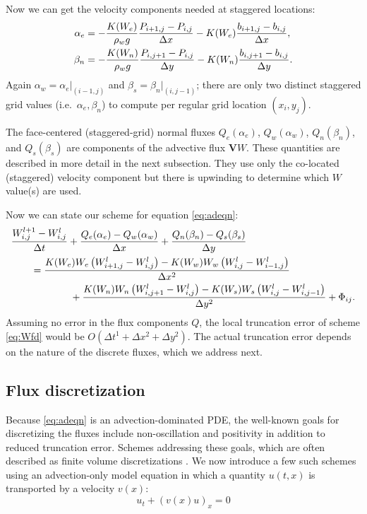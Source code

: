 \documentclass[11pt,final]{amsart}%
\newcommand\bV{\mathbf{V}}
\newcommand{\Wlij}{W^l_{i,j}}
\begin{document}
Now we can get the velocity components needed at staggered locations:
\begin{align}
\alpha_e &= - \frac{K(W_e)}{\rho_w g} \frac{P_{i+1,j}-P_{i,j}}{\Delta x} - K(W_e) \frac{b_{i+1,j}-b_{i,j}}{\Delta x}, \label{eq:velocitycomp} \\
\beta_n  &= - \frac{K(W_n)}{\rho_w g} \frac{P_{i,j+1}-P_{i,j}}{\Delta y} - K(W_n) \frac{b_{i,j+1}-b_{i,j}}{\Delta y}. \notag
\end{align}
Again $\alpha_w = \alpha_e\big|_{(i-1,j)}$ and $\beta_s = \beta_n\big|_{(i,j-1)}$; there are only two distinct staggered grid values (i.e.~$\alpha_e,\beta_n$) to compute per regular grid location $(x_i,y_j)$.

The face-centered (staggered-grid) normal fluxes $Q_e(\alpha_e)$, $Q_w(\alpha_w)$, $Q_n(\beta_n)$, and $Q_s(\beta_s)$ are components of the advective flux $\bV W$.  These quantities are described in more detail in the next subsection.  They use only the co-located (staggered) velocity component but there is upwinding to determine which $W$ value(s) are used.

Now we can state our scheme for equation \eqref{eq:adeqn}:
\begin{align}
 &\frac{W_{i,j}^{l+1} - \Wlij}{\Delta t} + \frac{Q_e(\alpha_e) - Q_w(\alpha_w)}{\Delta x} + \frac{Q_n(\beta_n) - Q_s(\beta_s)}{\Delta y}  \label{eq:Wfd} \\
      &\qquad = \frac{K(W_e) W_e \left(W_{i+1,j}^l - \Wlij\right) - K(W_w) W_w \left(\Wlij - W_{i-1,j}^l\right)}{\Delta x^2}  \notag \\
      &\qquad\qquad\qquad + \frac{K(W_n) W_n \left(W_{i,j+1}^l - \Wlij\right) - K(W_s) W_s \left(\Wlij - W_{i,j-1}^l\right)}{\Delta y^2} + \Phi_{ij}. \notag
\end{align}
Assuming no error in the flux components $Q$, the local truncation error \citep{MortonMayers} of scheme \eqref{eq:Wfd} would be $O(\Delta t^1 + \Delta x^2 + \Delta y^2)$.  The actual truncation error depends on the nature of the discrete fluxes, which we address next.


\subsection*{Flux discretization}  Because \eqref{eq:adeqn} is an advection-dominated PDE, the well-known goals for discretizing the fluxes include non-oscillation and positivity \citep{HundsdorferVerwer2010} in addition to reduced truncation error.  Schemes addressing these goals, which are often described as finite volume discretizations \citep{LeVeque}.  We now introduce a few such schemes using an advection-only model equation in which a quantity $u(t,x)$ is transported by a velocity $v(x)$:
\begin{equation} \label{eq:modeladvect}
u_t + (v(x) u)_x = 0
\end{equation}
\end{document}
